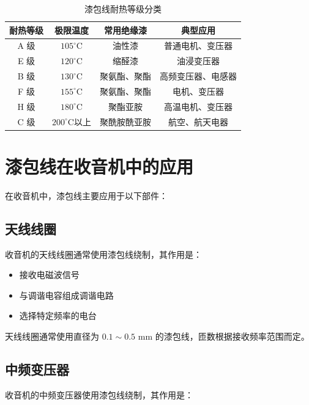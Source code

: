 \documentclass[12pt,UTF8]{ctexbook}
\begin{document}
\begin{table}[H]
    \centering
    \begin{tabular}{|c|c|c|c|}
        \hline
        \textbf{耐热等级} & \textbf{极限温度} & \textbf{常用绝缘漆} & \textbf{典型应用} \\
        \hline
        A 级 & $105^\circ$C & 油性漆 & 普通电机、变压器 \\
        \hline
        E 级 & $120^\circ$C & 缩醛漆 & 油浸变压器 \\
        \hline
        B 级 & $130^\circ$C & 聚氨酯、聚酯 & 高频变压器、电感器 \\
        \hline
        F 级 & $155^\circ$C & 聚氨酯、聚酯 & 电机、变压器 \\
        \hline
        H 级 & $180^\circ$C & 聚酯亚胺 & 高温电机、变压器 \\
        \hline
        C 级 & $200^\circ$C以上 & 聚酰胺酰亚胺 & 航空、航天电器 \\
        \hline
    \end{tabular}
    \caption{漆包线耐热等级分类}
    \label{tab:enamel_wire_class}
\end{table}

\section{漆包线在收音机中的应用}

在收音机中，漆包线主要应用于以下部件：

\subsection{天线线圈}

收音机的天线线圈通常使用漆包线绕制，其作用是：

\begin{itemize}[leftmargin=2cm]
    \item 接收电磁波信号
    \item 与调谐电容组成调谐电路
    \item 选择特定频率的电台
\end{itemize}

天线线圈通常使用直径为 $0.1 \sim 0.5$ mm 的漆包线，匝数根据接收频率范围而定。

\subsection{中频变压器}

收音机的中频变压器使用漆包线绕制，其作用是：
\end{document}
